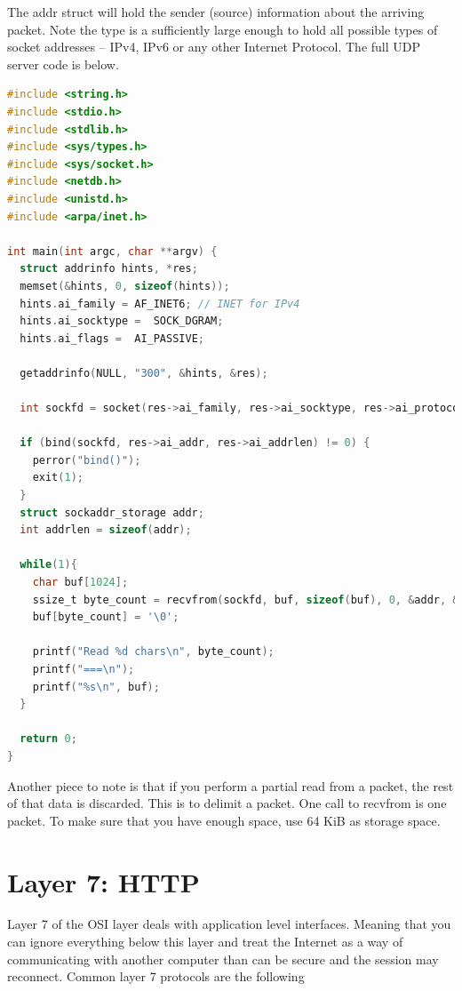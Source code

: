 The addr struct will hold the sender (source) information about the arriving packet.
Note the  type is a sufficiently large enough to hold all possible types of socket addresses -- IPv4, IPv6 or any other Internet Protocol.
The full UDP server code is below.

\begin{lstlisting}[language=C]
#include <string.h>
#include <stdio.h>
#include <stdlib.h>
#include <sys/types.h>
#include <sys/socket.h>
#include <netdb.h>
#include <unistd.h>
#include <arpa/inet.h>

int main(int argc, char **argv) {
  struct addrinfo hints, *res;
  memset(&hints, 0, sizeof(hints));
  hints.ai_family = AF_INET6; // INET for IPv4
  hints.ai_socktype =  SOCK_DGRAM;
  hints.ai_flags =  AI_PASSIVE;

  getaddrinfo(NULL, "300", &hints, &res);

  int sockfd = socket(res->ai_family, res->ai_socktype, res->ai_protocol);

  if (bind(sockfd, res->ai_addr, res->ai_addrlen) != 0) {
    perror("bind()");
    exit(1);
  }
  struct sockaddr_storage addr;
  int addrlen = sizeof(addr);

  while(1){
    char buf[1024];
    ssize_t byte_count = recvfrom(sockfd, buf, sizeof(buf), 0, &addr, &addrlen);
    buf[byte_count] = '\0';

    printf("Read %d chars\n", byte_count);
    printf("===\n");
    printf("%s\n", buf);
  }

  return 0;
}
\end{lstlisting}

Another piece to note is that if you perform a partial read from a packet, the rest of that data is discarded.
This is to delimit a packet.
One call to recvfrom is one packet.
To make sure that you have enough space, use 64 KiB as storage space.

\section{Layer 7: HTTP}

Layer 7 of the OSI layer deals with application level interfaces.
Meaning that you can ignore everything below this layer and treat the Internet as a way of communicating with another computer than can be secure and the session may reconnect.
Common layer 7 protocols are the following

